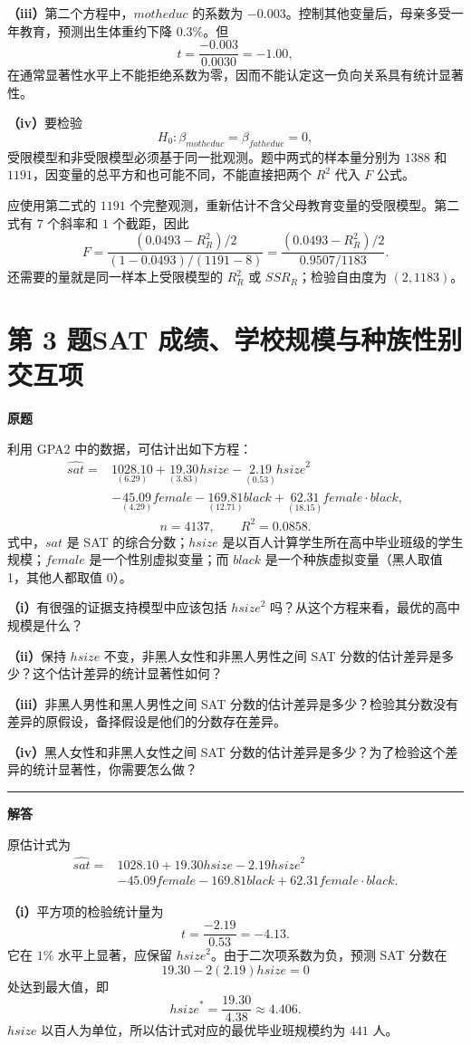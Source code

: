 \documentclass[UTF8,a4paper,11pt,fontset=fandol]{ctexart}
\newcommand{\vr}[1]{\mathit{#1}}
\newcommand{\subq}[1]{\par\medskip\noindent\textbf{（#1）}\enspace}
\newcommand{\question}[2]{\def\currentquestiontitle{第 #1 题\quad #2}}
\newcommand{\coef}[2]{\underset{\scriptstyle(#2)}{#1}}
\newenvironment{originalquestion}{%
  \par\medskip\noindent\begin{minipage}{\linewidth}
  \section*{\currentquestiontitle}
  \par\smallskip\noindent\textbf{原题}\par\smallskip
  \begingroup\small\setlength{\parskip}{2.5pt}%
}{%
  \par\endgroup\end{minipage}\par\medskip\Needspace{6\baselineskip}
  \noindent\rule{\linewidth}{0.35pt}\par\smallskip
  \noindent\textbf{解答}\par
}
\begin{document}
\subq{iii}第二个方程中，$\vr{motheduc}$ 的系数为 $-0.003$。控制其他变量后，母亲多受一年教育，预测出生体重约下降 $0.3\%$。但
\[
t=\frac{-0.003}{0.0030}=-1.00,
\]
在通常显著性水平上不能拒绝系数为零，因而不能认定这一负向关系具有统计显著性。

\subq{iv}要检验
\[
H_0:\beta_{\vr{motheduc}}=\beta_{\vr{fatheduc}}=0,
\]
受限模型和非受限模型必须基于同一批观测。题中两式的样本量分别为 $1388$ 和 $1191$，因变量的总平方和也可能不同，不能直接把两个 $R^2$ 代入 $F$ 公式。

应使用第二式的 $1191$ 个完整观测，重新估计不含父母教育变量的受限模型。第二式有 $7$ 个斜率和 $1$ 个截距，因此
\[
F=\frac{(0.0493-R_R^2)/2}{(1-0.0493)/(1191-8)}
 =\frac{(0.0493-R_R^2)/2}{0.9507/1183}.
\]
还需要的量就是同一样本上受限模型的 $R_R^2$ 或 $SSR_R$；检验自由度为 $(2,1183)$。

\question{3}{SAT 成绩、学校规模与种族性别交互项}
\begin{originalquestion}
利用 GPA2 中的数据，可估计出如下方程：
\[
\begin{aligned}
\widehat{\vr{sat}}={}&\coef{1028.10}{6.29}
+\coef{19.30}{3.83}\vr{hsize}
-\coef{2.19}{0.53}\vr{hsize}^2\\
&-\coef{45.09}{4.29}\vr{female}
-\coef{169.81}{12.71}\vr{black}
+\coef{62.31}{18.15}\vr{female}\cdot\vr{black},
\end{aligned}
\]
\[
n=4137,\qquad R^2=0.0858.
\]
式中，$\vr{sat}$ 是 SAT 的综合分数；$\vr{hsize}$ 是以百人计算学生所在高中毕业班级的学生规模；$\vr{female}$ 是一个性别虚拟变量；而 $\vr{black}$ 是一个种族虚拟变量（黑人取值 1，其他人都取值 0）。

\subq{i}有很强的证据支持模型中应该包括 $\vr{hsize}^2$ 吗？从这个方程来看，最优的高中规模是什么？

\subq{ii}保持 $\vr{hsize}$ 不变，非黑人女性和非黑人男性之间 SAT 分数的估计差异是多少？这个估计差异的统计显著性如何？

\subq{iii}非黑人男性和黑人男性之间 SAT 分数的估计差异是多少？检验其分数没有差异的原假设，备择假设是他们的分数存在差异。

\subq{iv}黑人女性和非黑人女性之间 SAT 分数的估计差异是多少？为了检验这个差异的统计显著性，你需要怎么做？
\end{originalquestion}

原估计式为
\[
\begin{aligned}
\widehat{\vr{sat}}={}&1028.10+19.30\vr{hsize}-2.19\vr{hsize}^2\\
&-45.09\vr{female}-169.81\vr{black}
+62.31\vr{female}\cdot\vr{black}.
\end{aligned}
\]
\subq{i}平方项的检验统计量为
\[
t=\frac{-2.19}{0.53}=-4.13.
\]
它在 $1\%$ 水平上显著，应保留 $\vr{hsize}^2$。由于二次项系数为负，预测 SAT 分数在
\[
19.30-2(2.19)\vr{hsize}=0
\]
处达到最大值，即
\[
\vr{hsize}^{*}=\frac{19.30}{4.38}\approx4.406.
\]
$\vr{hsize}$ 以百人为单位，所以估计式对应的最优毕业班规模约为 $\boxed{441\text{ 人}}$。
\end{document}
